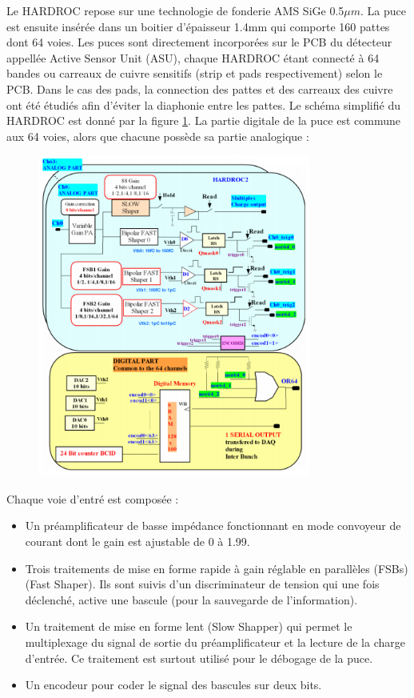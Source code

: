 Le HARDROC repose sur une technologie de fonderie AMS SiGe 0.5$\mu m$. La puce est ensuite insérée dans un boitier d'épaisseur 1.4mm qui comporte 160 pattes dont 64 voies. Les puces sont directement incorporées sur le PCB du détecteur appellée Active Sensor Unit (ASU), chaque HARDROC étant connecté à 64 bandes ou carreaux de cuivre sensitifs (strip et pads respectivement) selon le PCB. Dans le cas des pads, la connection des pattes et des carreaux des cuivre ont été étudiés afin d'éviter la diaphonie entre les pattes.
Le schéma simplifié du HARDROC est donné par la figure \ref{scheme}. La partie digitale de la puce est commune aux 64 voies, alors que chacune possède sa partie analogique :
\begin{figure}[ht!]
	\centering
	\includegraphics[width=0.8\textwidth]{GLA/scheme.png}
	\label{scheme}
\end{figure}

Chaque voie d'entré est composée :
\begin{itemize}[label=$\bullet$]
	\item Un préamplificateur de basse impédance fonctionnant en mode convoyeur de courant dont le gain est ajustable de 0 à 1.99.
	\item Trois traitements de mise en forme rapide à gain réglable en parallèles (FSBs) (Fast Shaper). Ils sont suivis d'un discriminateur de tension qui une fois déclenché, active une bascule (pour la sauvegarde de l'information).
	\item Un traitement de mise en forme lent (Slow Shapper) qui permet le multiplexage du signal de sortie du préamplificateur et la lecture de la charge d'entrée. Ce traitement est surtout utilisé pour le débogage de la puce.
	\item Un encodeur pour coder le signal des bascules sur deux bits.
\end{itemize}

